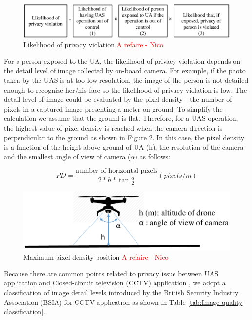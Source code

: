 \documentclass[a4paper, 10, conference]{ieeeconf}  %
\begin{document}
\begin{figure}[!ht]
	\centering
	\includegraphics[width=3.3 in]{image/likelihood_of_privacy_violation.pdf}
	\caption{Likelihood of privacy violation \textcolor{red}{A refaire - Nico}}
	\label{figure: new ham likelihood}
\end{figure}

 For a person exposed to the UA, the likelihood of privacy violation depends on the detail level of image collected by on-board camera. For example, if the photo taken by the UAS is at too low resolution, the image of the person is not detailed enough to recognize her/his face so the likelihood of privacy violation is low. The detail level of image could be evaluated by the pixel density - the number of pixels in a captured image presenting a meter on ground. To simplify the calculation we assume that the ground is flat. Therefore, for a UAS operation, the highest value of pixel density is reached when the camera direction is perpendicular to the ground as shown in Figure \ref{flat ground}. In this case, the pixel density is a function of the height above ground of UA (h), the resolution of the camera and the smallest angle of view of camera ($\alpha$) as follows:
 
  \[PD=\frac{\text{number  of  horizontal  pixels}}{2*h*\tan \frac{\alpha}{2}}(pixels/m)\]

\begin{figure}[!ht]
	\centering
	\includegraphics[width=3.2 in]{image/Maximum_pixel_density.pdf}
	\caption{Maximum pixel density position \textcolor{red}{A refaire - Nico}}
	\label{flat ground}
\end{figure}
Because there are common points related to privacy issue between UAS application and Closed-circuit television (CCTV) application \cite{7383633, 7883702, 7285023}, we adopt a classification of image detail levels introduced by the British Security Industry Association (BSIA) for CCTV application as shown in Table \ref{tab:Image quality classification}.
\end{document}
